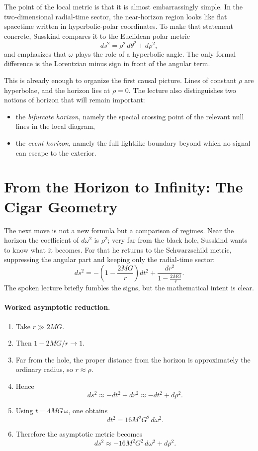 The point of the local metric is that it is almost embarrassingly simple. In the two-dimensional radial-time sector, the near-horizon region looks like flat spacetime written in hyperbolic-polar coordinates. To make that statement concrete, Susskind compares it to the Euclidean polar metric
\begin{equation}
ds^2 = \rho^2\,d\theta^2 + d\rho^2,
\end{equation}
and emphasizes that \(\omega\) plays the role of a hyperbolic angle. The only formal difference is the Lorentzian minus sign in front of the angular term.

This is already enough to organize the first causal picture. Lines of constant \(\rho\) are hyperbolae, and the horizon lies at \(\rho=0\). The lecture also distinguishes two notions of horizon that will remain important:
\begin{itemize}
\item the \emph{bifurcate horizon}, namely the special crossing point of the relevant null lines in the local diagram,
\item the \emph{event horizon}, namely the full lightlike boundary beyond which no signal can escape to the exterior.
\end{itemize}

\section{From the Horizon to Infinity: The Cigar Geometry}

The next move is not a new formula but a comparison of regimes. Near the horizon the coefficient of \(d\omega^2\) is \(\rho^2\); very far from the black hole, Susskind wants to know what it becomes. For that he returns to the Schwarzschild metric, suppressing the angular part and keeping only the radial-time sector:
\begin{equation}
ds^2 = -\left(1-\frac{2MG}{r}\right)dt^2 + \frac{dr^2}{1-\frac{2MG}{r}}.
\end{equation}
The spoken lecture briefly fumbles the signs, but the mathematical intent is clear.

\paragraph{Worked asymptotic reduction.}
\begin{enumerate}
\item Take \(r\gg 2MG\).
\item Then \(1-2MG/r \to 1\).
\item Far from the hole, the proper distance from the horizon is approximately the ordinary radius, so \(r\approx \rho\).
\item Hence
\[
ds^2 \approx -dt^2 + dr^2 \approx -dt^2 + d\rho^2.
\]
\item Using \(t=4MG\,\omega\), one obtains
\[
dt^2 = 16M^2G^2\,d\omega^2.
\]
\item Therefore the asymptotic metric becomes
\begin{equation}
ds^2 \approx -16M^2G^2\,d\omega^2 + d\rho^2.
\end{equation}
\end{enumerate}

